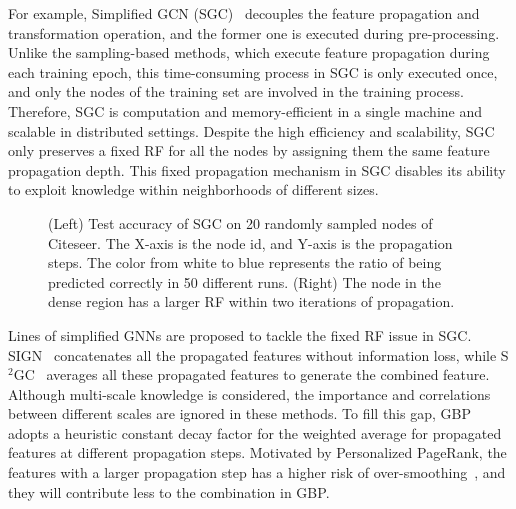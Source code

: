 \documentclass[sigconf]{acmart}
\begin{document}
For example, Simplified GCN (SGC)~\citep{wu2019simplifying} decouples the feature propagation and transformation operation, and the former one is executed during pre-processing.
Unlike the sampling-based methods, which execute feature propagation during each training epoch, this time-consuming process in SGC is only executed once, and only the nodes of the training set are involved in the training process.
Therefore, SGC is computation and memory-efficient in a single machine and scalable in distributed settings.
Despite the high efficiency and scalability, SGC only preserves a fixed RF for all the nodes by assigning them the same feature propagation depth.
This fixed propagation mechanism in SGC disables its ability to exploit knowledge within neighborhoods of different sizes. 



\begin{figure*}[tp!]
\vspace{-5mm}
\centering  
{}
\centering
{}
\vspace{-4mm}
\caption{  (Left) Test accuracy of SGC on 20 randomly sampled nodes of Citeseer. The X-axis is the node id, and Y-axis is the propagation steps. The color from white to blue represents the ratio of being predicted correctly in 50 different runs. (Right) The node in the dense region has a larger RF within two iterations of propagation.
}
\label{fig.observation}
\vspace{-4mm}
\end{figure*}




Lines of simplified GNNs are proposed to tackle the fixed RF issue in SGC.
SIGN~\citep{frasca2020sign} concatenates all the propagated features without information loss, while S$^2$GC~\citep{zhu2021simple} averages all these propagated features to generate the combined feature. 
Although multi-scale knowledge is considered, the importance and correlations between different scales are ignored in these methods. 
To fill this gap, GBP~\citep{DBLP:conf/nips/ChenWDL00W20} adopts a heuristic constant decay factor for the weighted average for propagated features at different propagation steps.
Motivated by Personalized PageRank, the features with a larger propagation step has a higher risk of over-smoothing~\citep{li2018deeper,xu2018representation}, and they will contribute less to the combination in GBP. 
\end{document}
